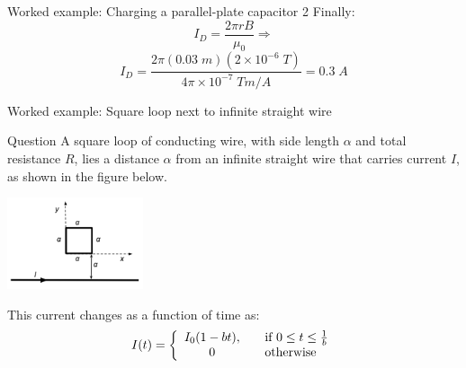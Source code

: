 {\begin{frame}{Worked example: Charging a parallel-plate capacitor 2}
  Finally:
  \begin{equation*}
    I_D = \frac{2\pi r B}{\mu_0} \Rightarrow
  \end{equation*}
  \begin{equation*}
    I_D =
      \frac{2\pi(0.03\;m)(2 \times 10^{-6} \; T)}{4\pi \times 10^{-7}\; Tm/A} =
      0.3 \; A
  \end{equation*}

\end{frame}

} %

%
%

{
\problemslide

%
%
%

\begin{frame}{Worked example: Square loop next to infinite straight wire}

  \begin{blockexmplque}{Question}
    A square loop of conducting wire, with side length $\alpha$ and total resistance $R$,
    lies a distance $\alpha$ from an infinite straight wire that carries current $I$,\\
    as shown in the figure below.
    \begin{center}
        \includegraphics[width=0.30\textwidth]{./images/problems/lect08_square_loop_next_to_straight_wire.png}
    \end{center}
    This current changes as a function of time as:
    \begin{equation*}
      I(t) =
      \left\{
        \begin{array}{ c l }
          I_0 (1-bt),  & \quad \textrm{if } 0 \leq t \leq \frac{1}{b} \\
          0            & \quad \textrm{otherwise}
        \end{array}
     \right.
    \end{equation*}
  \end{blockexmplque}

\end{frame}

%
%
%

}
